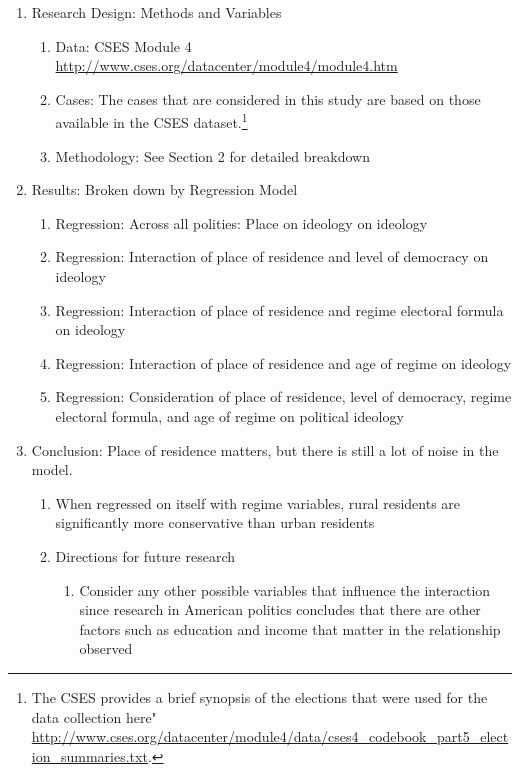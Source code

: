 \documentclass[12pt]{article}
\begin{document}
\begin{enumerate}
\item Research Design: Methods and Variables 
\begin{enumerate}
	\item Data: CSES Module 4 \url{http://www.cses.org/datacenter/module4/module4.htm}
	\item Cases: The cases that are considered in this study are based on those available in the CSES dataset.\footnote{The CSES provides a brief synopsis of the elections that were used for the data collection here" \url{http://www.cses.org/datacenter/module4/data/cses4_codebook_part5_election_summaries.txt}.}
	\item Methodology: See Section 2 for detailed breakdown
\end{enumerate}
\item Results: Broken down by Regression Model
\begin{enumerate}
	\item Regression: Across all polities: Place on ideology on ideology
	\item Regression: Interaction of place of residence and level of democracy on ideology
	\item Regression: Interaction of place of residence and regime electoral formula on ideology
	\item Regression: Interaction of place of residence and age of regime on ideology
	\item Regression: Consideration of place of residence, level of democracy, regime electoral formula, and age of regime on political ideology
\end{enumerate}
\item Conclusion: Place of residence matters, but there is still a lot of noise in the model.
\begin{enumerate}
	\item When regressed on itself with regime variables, rural residents are significantly more conservative than urban residents
	\item Directions for future research
	\begin{enumerate}
		\item Consider any other possible variables that influence the interaction since research in American politics concludes that there are other factors such as education and income that matter in the relationship observed \citep{gimpel_rural_2006}
	\end{enumerate}
\end{enumerate}
\end{enumerate}
\end{document}
